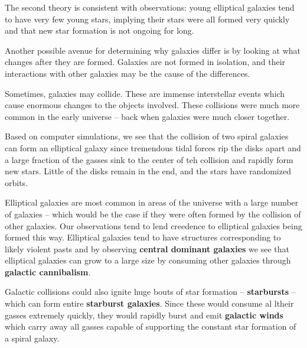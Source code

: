 \documentclass[12pt]{article}
\begin{document}
The second theory is consistent with observations: young elliptical galaxies tend to have very few young stars, implying their stars were all formed very quickly and that new star formation is not ongoing for long.

Another possible avenue for determining why galaxies differ is by looking at what changes after they are formed. Galaxies are not formed in isolation, and their interactions with other galaxies may be the cause of the differences.

Sometimes, galaxies may collide. These are immense interstellar events which cause enormous changes to the objects involved. These collisions were much more common in the early universe -- back when galaxies were much closer together.

Based on computer simulations, we see that the collision of two spiral galaxies can form an elliptical galaxy since tremendous tidal forces rip the disks apart and a large fraction of the gasses sink to the center of teh collision and rapidly form new stars. Little of the disks remain in the end, and the stars have randomized orbits.

Elliptical galaxies are most common in areas of the universe with a large number of galaxies -- which would be the case if they were often formed by the collision of other galaxies. Our observations tend to lend creedence to elliptical galaxies being formed this way. Elliptical galaxies tend to have structures corresponding to likely violent pasts and by observing {\bf central dominant galaxies} we see that elliptical galaxies can grow to a large size by consuming other galaxies through {\bf galactic cannibalism}.

Galactic collisions could also ignite huge bouts of star formation -- {\bf starbursts} -- which can form entire {\bf starburst galaxies}. Since these would consume al ltheir gasses extremely quickly, they would rapidly burst and emit {\bf galactic winds} which carry away all gasses capable of supporting the constant star formation of a spiral galaxy.

\end{document}
